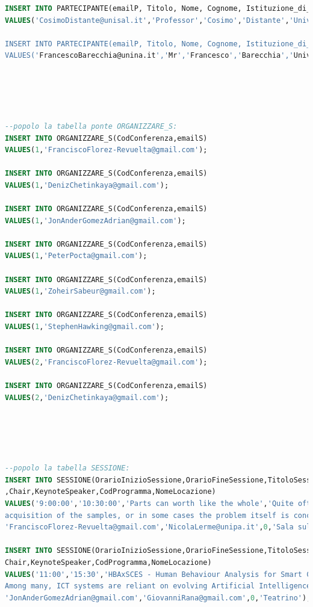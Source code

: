 \documentclass[a4page]{article}
\begin{document}
\begin{lstlisting}[language=SQL,
        deletekeywords={IDENTITY,INT},
        morekeywords={clustered},    
        framesep=10pt,
        framextopmargin=10pt]
INSERT INTO PARTECIPANTE(emailP, Titolo, Nome, Cognome, Istituzione_di_Afferenza)
VALUES('CosimoDistante@unisal.it','Professor','Cosimo','Distante','Universita' del Salento');

INSERT INTO PARTECIPANTE(emailP, Titolo, Nome, Cognome, Istituzione_di_Afferenza)
VALUES('FrancescoBarecchia@unina.it','Mr','Francesco','Barecchia','Universita' degli Studi di Napoli Federico II');





--popolo la tabella ponte ORGANIZZARE_S:
INSERT INTO ORGANIZZARE_S(CodConferenza,emailS)
VALUES(1,'FranciscoFlorez-Revuelta@gmail.com');

INSERT INTO ORGANIZZARE_S(CodConferenza,emailS)
VALUES(1,'DenizChetinkaya@gmail.com');

INSERT INTO ORGANIZZARE_S(CodConferenza,emailS)
VALUES(1,'JonAnderGomezAdrian@gmail.com');

INSERT INTO ORGANIZZARE_S(CodConferenza,emailS)
VALUES(1,'PeterPocta@gmail.com');

INSERT INTO ORGANIZZARE_S(CodConferenza,emailS)
VALUES(1,'ZoheirSabeur@gmail.com');

INSERT INTO ORGANIZZARE_S(CodConferenza,emailS)
VALUES(1,'StephenHawking@gmail.com');

INSERT INTO ORGANIZZARE_S(CodConferenza,emailS)
VALUES(2,'FranciscoFlorez-Revuelta@gmail.com');

INSERT INTO ORGANIZZARE_S(CodConferenza,emailS)
VALUES(2,'DenizChetinkaya@gmail.com');





--popolo la tabella SESSIONE:
INSERT INTO SESSIONE(OrarioInizioSessione,OrarioFineSessione,TitoloSessione,DescrizioneSessione
,Chair,KeynoteSpeaker,CodProgramma,NomeLocazione)
VALUES('9:00:00','10:30:00','Parts can worth like the whole','Quite often the useful data for an analysis task are not available in an optimal condition. This may be due to the occlusions or the noise affecting the 
acquisition of the samples, or in some cases the problem itself is conceived in a way that a solution comes from the analysis of smaller portions of the input.', 
'FranciscoFlorez-Revuelta@gmail.com','NicolaLerme@unipa.it',0,'Sala sul Chiostro del 500 (First floor)');
	   
INSERT INTO SESSIONE(OrarioInizioSessione,OrarioFineSessione,TitoloSessione,DescrizioneSessione,
Chair,KeynoteSpeaker,CodProgramma,NomeLocazione)
VALUES('11:00','15:30','HBAxSCES - Human Behaviour Analysis for Smart City Environment Safety','Nowadays, Smart Cities aim to ensure secure and safe physical and digital environments for the well-being of citizens.
Among many, ICT systems are reliant on evolving Artificial Intelligence, Pattern Recognition, Computer Vision, 3D simulations and Digital Twins techniques to make the environments more resilient.',
'JonAnderGomezAdrian@gmail.com','GiovanniRana@gmail.com',0,'Teatrino');


\end{lstlisting}
\end{document}
